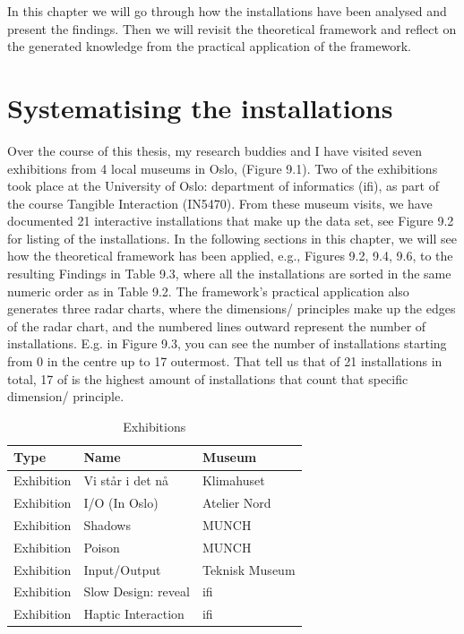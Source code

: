 In this chapter we will go through how the installations have been analysed and present the findings. Then we will revisit the theoretical framework and reflect on the generated knowledge from the practical application of the framework.

\section{Systematising the installations}
Over the course of this thesis, my research buddies and I have visited seven exhibitions from 4 local museums in Oslo, (Figure 9.1). Two of the exhibitions took place at the University of Oslo: department of informatics (ifi), as part of the course Tangible Interaction (IN5470). From these museum visits, we have documented 21 interactive installations that make up the data set, see Figure 9.2 for listing of the installations. In the following sections in this chapter, we will see how the theoretical framework has been applied, e.g., Figures 9.2, 9.4, 9.6, to the resulting Findings in Table 9.3, where all the installations are sorted in the same numeric order as in Table 9.2. The framework's practical application also generates three radar charts, where the dimensions/ principles make up the edges of the radar chart, and the numbered lines outward represent the number of installations. E.g. in Figure 9.3, you can see the number of installations starting from 0 in the centre up to 17 outermost. That tell us that of 21 installations in total, 17 of is the highest amount of installations that count that specific dimension/ principle.

\begin{table}[H]
\centering
\begin{tabular}{| l | l| l|}
\hline
\textbf{Type} & \textbf{Name} & \textbf{Museum}\\
\hline
Exhibition & Vi står i det nå & Klimahuset \\
Exhibition & I/O (In Oslo) & Atelier Nord\\
Exhibition & Shadows & MUNCH\\
Exhibition & Poison & MUNCH \\
Exhibition & Input/Output & Teknisk Museum \\
Exhibition & Slow Design: reveal & ifi \\
Exhibition & Haptic Interaction & ifi \\
\hline
\end{tabular}
\caption{Exhibitions}
\label{tab:abc}
\end{table}

